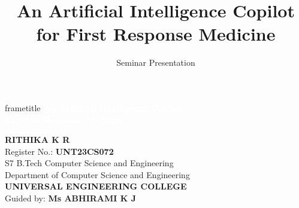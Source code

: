 \documentclass[aspectratio=169, 10pt]{beamer}
\title[An Artificial Intelligence Copilot for First Response Medicine]{An Artificial Intelligence Copilot for First Response Medicine}
\author{Seminar Presentation}
\date{}
\begin{document}
\begin{frame}[plain]
    \vspace*{1.0cm}
    \nointerlineskip
    \begin{beamercolorbox}[wd=\paperwidth,ht=2.2cm,dp=0.5cm,center]{frametitle}
        {\LARGE\textbf{\textcolor{white}{An Artificial Intelligence Copilot\\[6pt]for First Response Medicine}}}
    \end{beamercolorbox}

    \vspace{0.8cm}
    \begin{center}
        {\large\textbf{RITHIKA K R}}\\[6pt]
        {\footnotesize Register No.: \textbf{UNT23CS072}}\\[4pt]
        {\footnotesize S7 B.Tech Computer Science and Engineering}\\[4pt]
        {\footnotesize Department of Computer Science and Engineering}\\[4pt]
        {\footnotesize \textbf{UNIVERSAL ENGINEERING COLLEGE}}\\[8pt]
        {\footnotesize Guided by: \textbf{Ms ABHIRAMI K J}}
    \end{center}
\end{frame}
\end{document}
